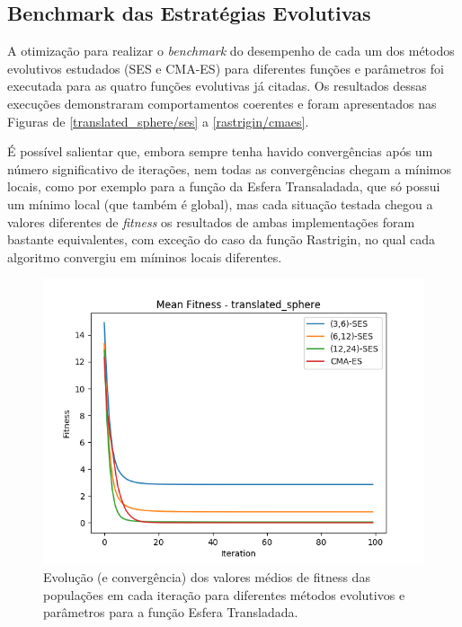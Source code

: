 \documentclass[conference]{IEEEtran}
\begin{document}
\subsection{Benchmark das Estratégias Evolutivas}

A otimização para realizar o \textit{benchmark} do desempenho de cada um dos métodos evolutivos estudados (SES e CMA-ES) para diferentes funções e parâmetros foi executada para as quatro funções evolutivas já citadas. Os resultados dessas execuções demonstraram comportamentos coerentes e foram apresentados nas Figuras de \ref{translated_sphere/ses} a \ref{rastrigin/cmaes}.

É possível salientar que, embora sempre tenha havido convergências após um número significativo de iterações, nem todas as convergências chegam a mínimos locais, como por exemplo para a função da Esfera Transaladada, que só possui um mínimo local (que também é global), mas cada situação testada chegou a valores diferentes de \textit{fitness} os resultados de ambas implementações foram bastante equivalentes, com exceção do caso da função Rastrigin, no qual cada algoritmo convergiu em míminos locais diferentes.


\begin{figure}[htbp]
\centering
\centerline{\includegraphics[scale=0.4]{imagens/translated_sphere/mean_fitness.png}}
\caption{Evolução (e convergência) dos valores médios de fitness das populações em cada iteração para diferentes métodos evolutivos e parâmetros para a função Esfera Transladada.}
\label{translated_sphere/mean_fitness}
\end{figure}
\end{document}
